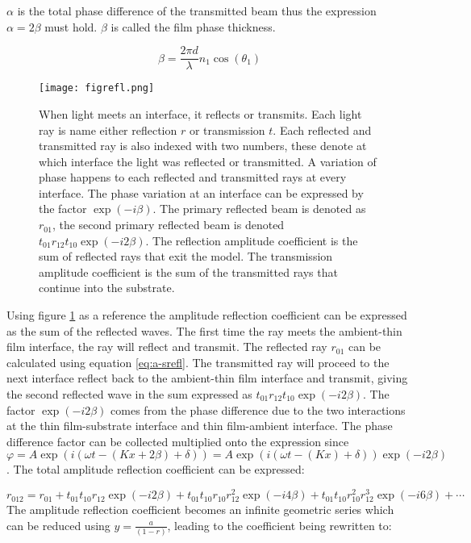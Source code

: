 \documentclass[MasterThesisMain.tex]{subfiles}
\begin{document}
$\alpha$ is the total phase difference of the transmitted beam thus the expression $\alpha=2\beta$ must hold. $\beta$ is called the film phase thickness. 

\begin{equation}
\beta=\frac{2\pi d}{\lambda} n_1\cos(\theta_1)
\end{equation}  

\begin{figure}
\centering
\texttt{[image: figrefl.png]}
\caption{When light meets an interface, it reflects or transmits. Each light ray is name either reflection $r$ or transmission $t$. Each reflected and transmitted ray is also indexed with two numbers, these denote at which interface the light was reflected or transmitted. A variation of phase happens to each reflected and transmitted rays at every interface. The phase variation at an interface can be expressed by the factor $\exp(-i\beta)$. The primary reflected beam is denoted as $r_{01}$, the second primary reflected beam is denoted $t_{01}r_{12}t_{10}\exp(-i2\beta)$. The reflection amplitude coefficient is the sum of reflected rays that exit the model. The transmission amplitude coefficient is the sum of the transmitted rays that continue into the substrate.}
\label{fig:reflect}
\end{figure}

Using figure \ref{fig:reflect} as a reference the amplitude reflection coefficient can be expressed as the sum of the reflected waves. The first time the ray meets the ambient-thin film interface, the ray will reflect and transmit. The reflected ray $r_{01}$ can be calculated using equation \ref{eq:a-srefl}. The transmitted ray will proceed to the next interface reflect back to the ambient-thin film interface and transmit, giving the second reflected wave in the sum expressed as $t_{01}r_{12}t_{10}\exp(-i2\beta)$. The factor $\exp(-i2\beta)$ comes from the phase difference due to the two interactions at the thin film-substrate interface and thin film-ambient interface. The phase difference factor can be collected multiplied onto the expression since  $\varphi = A\exp(i(\omega t-(Kx+2\beta)+\delta))=A\exp(i(\omega t-(Kx)+\delta))\exp(-i2\beta)$. The total amplitude reflection coefficient can be expressed:

\begin{equation}
r_{012} = r_{01} + t_{01}t_{10}r_{12}\exp(-i2\beta) + t_{01}t_{10}r_{10}r_{12}^2\exp(-i4\beta)+ t_{01}t_{10}r_{10}^2r_{12}^3\exp(-i6\beta)+ \cdots
\end{equation}  
The amplitude reflection coefficient becomes an infinite geometric series which can be reduced using $y=\frac{a}{(1-r)}$, leading to the coefficient being rewritten to:
\end{document}
